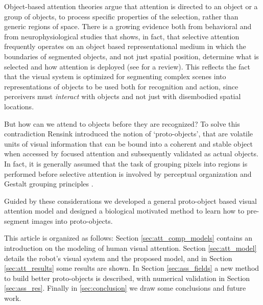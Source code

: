 \documentclass{llncs}
\begin{document}
Object-based attention theories
argue that attention is directed to an object or a group
of objects, to process specific properties of the selection,
rather than generic regions of space. There is a
growing evidence both from behavioral and from
neurophysiological studies that shows, in fact, that
selective attention frequently operates on an object based
representational medium in which the
boundaries of segmented objects, and not just spatial
position, determine what is selected and how attention
is deployed (see \cite{Scholl01} for a review). This reflects the fact
that the visual system is optimized for segmenting
complex scenes into representations of objects to be used both for recognition and
action, since perceivers must \emph{interact} with objects and
not just with disembodied spatial locations.

But how can we attend to objects before they are recognized?
To solve this contradiction Rensink \cite{RensinkORC97,Rensink00a}
introduced the notion of `proto-objects', that are volatile units
of visual information that can be bound into a coherent and
stable object when accessed by focused attention and
subsequently validated as actual objects.
In fact, it is generally assumed that the task of grouping pixels
into regions is performed before selective attention is involved
by perceptual organization and Gestalt grouping principles \cite{PalmerR94}.

Guided by these considerations we developed a general proto-object based
visual attention model and designed a biological motivated
method to learn how to pre-segment images into proto-objects.

This article is organized as follows:
Section \ref{sec:att_comp_models} contains an introduction on the modeling of
human visual attention. Section \ref{sec:att_model}
details the robot's visual system and the
proposed model, and in Section \ref{sec:att_results} some results are shown.
In Section \ref{sec:ass_fields} a new method to build better proto-objects is described,
with numerical validation in Section \ref{sec:ass_res}. Finally in \ref{sec:conclusion}
we draw some conclusions and future work.
\end{document}
